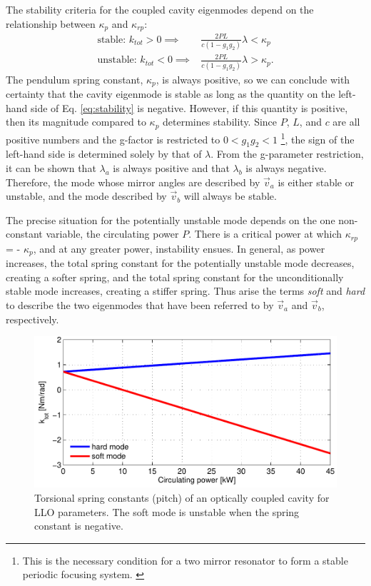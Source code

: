 The stability criteria for the coupled cavity eigenmodes 
depend on the relationship between $\kappa_p$ and $\kappa_{rp}$:
\begin{align}
\mbox{stable: } k_{tot} > 0 \implies & \frac{2 P L}{c (1-g_1 g_2)} \lambda < \kappa_p \\
\mbox{unstable: } k_{tot} < 0 \implies & \frac{2 P L}{c (1-g_1 g_2)} \lambda > \kappa_p.
\label{eq:stability}
\end{align}
The pendulum spring constant, $\kappa_p$, is always positive, so we
can conclude with certainty that the cavity eigenmode is stable as
long as the quantity on the left-hand side of Eq. \ref{eq:stability}
is negative. However, if this quantity is positive, then its magnitude
compared to $\kappa_p$ determines stability. Since $P$, $L$, and $c$
are all positive numbers and the g-factor is restricted to $0 < g_1g_2
< 1$ \footnote{This is the necessary condition for a two mirror
  resonator to form a stable periodic focusing
  system. \cite[p. 747]{Siegman1986Lasers}}, the sign of the left-hand
side is determined solely by that of $\lambda$. From the g-parameter
restriction, it can be shown that $\lambda_a$ is always positive and
that $\lambda_b$ is always negative. Therefore, the mode whose mirror
angles are described by $\vec{v}_a$ is either stable or unstable, and
the mode described by $\vec{v}_b$ will always be stable.

The precise situation for the potentially unstable mode depends on the
one non-constant variable, the circulating power $P$. There is a
critical power at which $\kappa_{rp}$ = - $\kappa_p$, and at any
greater power, instability ensues. In general, as power increases, the
total spring constant for the potentially unstable mode decreases,
creating a softer spring, and the total spring constant for the
unconditionally stable mode increases, creating a stiffer spring. Thus
arise the terms \emph{soft} and \emph{hard} to describe the two
eigenmodes that have been referred to by $\vec{v}_a$ and $\vec{v}_b$,
respectively.

\begin{figure}
\begin{centering}
\includegraphics[width=1.0\textwidth]{figures/khardsoftLLO.pdf}
\caption{Torsional spring constants (pitch) of an optically coupled
  cavity for LLO parameters. The soft mode is unstable when the spring
  constant is negative.}
\label{fig:k_hardsoft}
\end{centering}
\end{figure}

